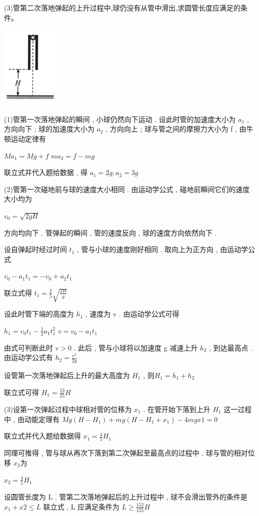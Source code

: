 (3)管第二次落地弹起的上升过程中,球仍没有从管中滑出,求圆管长度应满足的条件。
\begin{center}
\includegraphics[]{img/image8.png}
\end{center}
\begin{solution}{4cm}
(1)管第一次落地弹起的瞬间 , 小球仍然向下运动 . 设此时管的加速度大小为 $a _1$ , 方向向下 ; 球的加速度大小为 $a _2$ , 方向向上 ; 球与管之间的摩擦力大小为 f , 由牛顿运动定律有

$Ma _1 = Mg + f$ 
$ma _2 = f - mg$ 

联立式并代入题给数据 , 得
$a _1 = 2 g ,  a_{2}=3g$ 

(2)管第一次碰地前与球的速度大小相同 . 由运动学公式 , 碰地前瞬间它们的速度大小均为

$v_{0}= \sqrt{2gH}$ 

方向均向下 . 管弹起的瞬间 , 管的速度反向 , 球的速度方向依然向下 .

设自弹起时经过时间 $t _1$ , 管与小球的速度刚好相同 . 取向上为正方向 , 由运动学公式

$v_0- a _1t _1 = - v _0+ a _2 t_1$ 

联立式得 
$t_{1}= \frac{2}{5} \sqrt{ \frac{2H}{g}}$ 

设此时管下端的高度为 $h _1$ , 速度为 v . 由运动学公式可得

$h_{1}=v_{0}t_{1}- \frac{1}{2}a_{1}t_{1}^{2}$ 
$v = v _0- a _1t _1$ 

由式可判断此时 $v > 0$ . 此后 , 管与小球将以加速度 g 减速上升 $h _2$ , 到达最高点 . 由运动学公式有  
$h_{2}= \frac{v^{2}}{2g}$ 

设管第一次落地弹起后上升的最大高度为 $H _1$ , 则$H _1 = h _1+ h _2$ 

联立式可得 $H_{1}= \frac{13}{25}H$ 

(3)设第一次弹起过程中球相对管的位移为 $x _1$ . 在管开始下落到上升 $H _1$ 这一过程中 , 由动能定理有
$Mg ( H - H _1 ) + mg ( H - H _1+ x _1 ) -4 mgx1 = 0$  

联立式并代入题给数据得 $x_{1}= \frac{4}{5}H_{1}$ 

同理可推得 , 管与球从再次下落到第二次弹起至最高点的过程中 , 球与管的相对位移 $x _2 $为

$ x_{2}= \frac{4}{5}H_{1}$ 

设圆管长度为 L . 管第二次落地弹起后的上升过程中 , 球不会滑出管外的条件是
$x _1+ x2 ≤ L$
联立式 , L 应满足条件为 $L \geqslant \frac{152}{125}H$

\end{solution}
